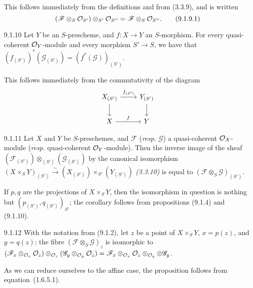 \documentclass[../main.tex]{subfiles}
\begin{document}
This follows immediately from the definitions and from (3.3.9), and is written
\begin{equation*}
    (\mathscr{F}\otimes_S\mathcal{O}_{S'})\otimes_{S'}\mathcal{O}_{S''} = \mathscr{F}\otimes_S\mathcal{O}_{S''}.\tag{9.1.9.1}
\end{equation*}

\begin{cx}[Proposition]{9.1.10}
    Let $Y$ be an $S$-prescheme, and $f\colon X\to Y$ an $S$-morphism.
    For every quasi-coherent $\mathcal{O}_Y$-module and every morphism $S'\to S$, we have that $(f_{(S')})^*(\mathscr{G}_{(S')})=(f^*(\mathscr{G}))_{(S')}$.
\end{cx}

This follows immediately from the commutativity of the diagram
\begin{equation*}
    \begin{tikzcd}
        X_{(S')}
            \ar{r}{f_{(S')}}
            \ar{d}
        & Y_{(S')}
            \ar{d}\\
        X
            \ar{r}{f}
        & Y
    \end{tikzcd}
\end{equation*}

\begin{cx}[Corollary]{9.1.11}
    Let $X$ and $Y$ be $S$-preschemes, and $\mathscr{F}$ (\emph{resp.} $\mathscr{G}$) a quasi-coherent $\mathcal{O}_X$-module (\emph{resp.} quasi-coherent $\mathcal{O}_Y$-module).
    Then the inverse image of the sheaf $(\mathscr{F}_{(S')})\otimes_{(S')}(\mathscr{G}_{(S')})$ by the canonical isomorphism $(X\times_S Y)_{(S')}\xrightarrow{\sim}(X_{(S')})\times_{S'}(Y_{(S')})$ \emph{(3.3.10)} is equal to $(\mathscr{F}\otimes_S\mathscr{G})_{(S')}$.
\end{cx}

If $p,q$ are the projections of $X\times_S Y$, then the isomorphism in question is nothing but $(p_{(S')}, q_{(S')})_{S'}$; the corollary follows from propositions (9.1.4) and (9.1.10).

\begin{cx}[Proposition]{9.1.12}
    With the notation from (9.1.2), let $z$ be a point of $X\times_S Y$, $x=p(z)$, and $y=q(z)$; the fibre $(\mathscr{F}\otimes_S\mathscr{G})_z$ is isomorphic to $(\mathscr{F}_x\otimes_{\mathcal{O}_x}\mathcal{O}_z)\otimes_{\mathcal{O}_z}(\mathscr{G}_y\otimes_{\mathcal{O}_y}\mathcal{O}_z) = \mathscr{F}_x\otimes_{\mathcal{O}_x}\mathcal{O}_z\otimes_{\mathcal{O}_y}\otimes\mathscr{G}_y$.
\end{cx}

As we can reduce ourselves to the affine case, the proposition follows from equation~(1.6.5.1).
\end{document}
